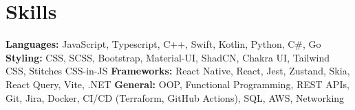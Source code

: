 \vspace{5 pt - 0.5 cm}
\section{Skills}
\begin{onecolentry}
    \textbf{Languages:} JavaScript, Typescript, C++, Swift, Kotlin, Python, C\#, Go \newline
    \textbf{Styling:} CSS, SCSS, Bootstrap, Material-UI, ShadCN, Chakra UI, Tailwind CSS, Stitches CSS-in-JS\newline
    \textbf{Frameworks:} React Native, React, Jest, Zustand, Skia, React Query, Vite, .NET  \newline
    \textbf{General:} OOP, Functional Programming, REST APIs, Git, Jira, Docker, CI/CD (Terraform, GitHub Actions), SQL, AWS, Networking \newline
\end{onecolentry}
